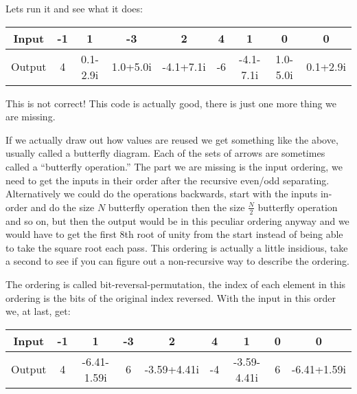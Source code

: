 \documentclass[12pt]{article}
\begin{document}
Lets run it and see what it does:

\begin{center}
  \begin{tabular}{ |c|c|c|c|c|c|c|c|c| }
    \hline
    Input  & -1 & 1        & -3       & 2         & 4  & 1         & 0        & 0        \\
    \hline
    Output & 4  & 0.1-2.9i & 1.0+5.0i & -4.1+7.1i & -6 & -4.1-7.1i & 1.0-5.0i & 0.1+2.9i \\
    \hline
  \end{tabular}
\end{center}

This is not correct! This code is actually good, there is just one more thing we are missing.

\pagebreak


If we actually draw out how values are reused we get something like the above, usually called a butterfly diagram. Each of the sets of arrows are sometimes called a ``butterfly operation.'' The part we are missing is the input ordering, we need to get the inputs in their order after the recursive even/odd separating. Alternatively we could do the operations backwards, start with the inputs in-order and do the size $N$ butterfly operation then the size $\frac{N}{2}$ butterfly operation and so on, but then the output would be in this peculiar ordering anyway and we would have to get the first 8th root of unity from the start instead of being able to take the square root each pass. This ordering is actually a little insidious, take a second to see if you can figure out a non-recursive way to describe the ordering.

The ordering is called bit-reversal-permutation, the index of each element in this ordering is the bits of the original index reversed. With the input in this order we, at last, get:
\begin{center}
  \begin{tabular}{ |c|c|c|c|c|c|c|c|c| }
    \hline
    Input  & -1 & 1           & -3 & 2           & 4  & 1           & 0 & 0           \\
    \hline
    Output & 4  & -6.41-1.59i & 6  & -3.59+4.41i & -4 & -3.59-4.41i & 6 & -6.41+1.59i \\
    \hline
  \end{tabular}
\end{center}
\end{document}
